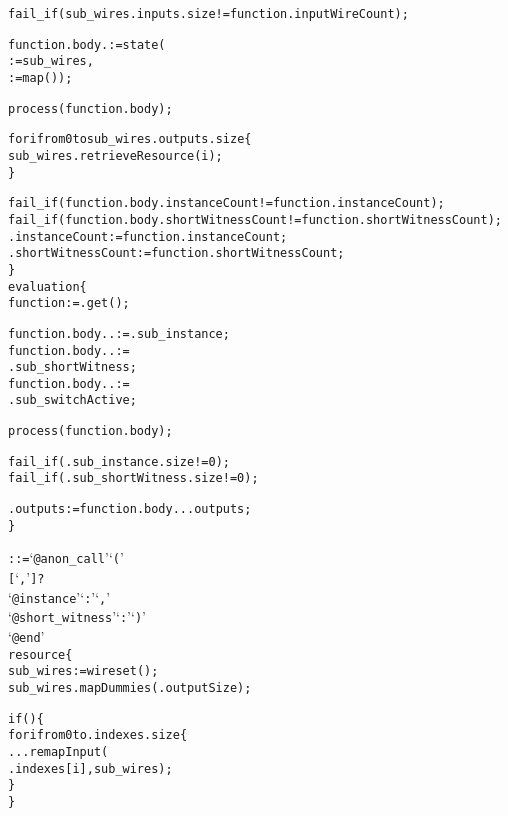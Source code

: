\begin{alltt}
    fail_if(sub_wires.inputs.size != function.inputWireCount);
    
    function.body. := state(
       := sub_wires,
       := map());

    process(function.body);

    for i from 0 to sub_wires.outputs.size \{
      sub_wires.retrieveResource(i);
    \}
    
    fail_if(function.body.instanceCount != function.instanceCount);
    fail_if(function.body.shortWitnessCount != function.shortWitnessCount);
    .instanceCount := function.instanceCount;
    .shortWitnessCount := function.shortWitnessCount;
  \}
  evaluation \{
    function := .get();
    
    function.body.. := .sub_instance;
    function.body.. :=
      .sub_shortWitness;
    function.body.. :=
      .sub_switchActive;

    process(function.body);
    
    fail_if(.sub_instance.size != 0);
    fail_if(.sub_shortWitness.size != 0);
    
    .outputs := function.body...outputs;
  \}\ttSyn

   ::= `@anon_call' `('
                           [  `,' ]?
                           `@instance' `:'   `,'
                           `@short_witness' `:'  `)'
                           `@end'\ttSem
  resource \{
    sub_wires := wireset();
    sub_wires.mapDummies(.outputSize);
    
    if() \{
      for i from 0 to .indexes.size \{
        ...remapInput(
          .indexes[i], sub_wires);
      \}
    \}
    

\end{alltt}
